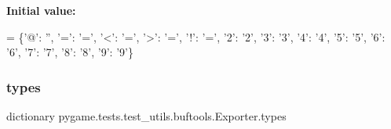 {\bfseries Initial value\+:}
\begin{DoxyCode}
=  \{\textcolor{stringliteral}{'@'}: \textcolor{stringliteral}{''}, \textcolor{stringliteral}{'='}: \textcolor{stringliteral}{'='}, \textcolor{stringliteral}{'<'}: \textcolor{stringliteral}{'='}, \textcolor{stringliteral}{'>'}: \textcolor{stringliteral}{'='}, \textcolor{stringliteral}{'!'}: \textcolor{stringliteral}{'='},
                \textcolor{stringliteral}{'2'}: \textcolor{stringliteral}{'2'}, \textcolor{stringliteral}{'3'}: \textcolor{stringliteral}{'3'}, \textcolor{stringliteral}{'4'}: \textcolor{stringliteral}{'4'}, \textcolor{stringliteral}{'5'}: \textcolor{stringliteral}{'5'},
                \textcolor{stringliteral}{'6'}: \textcolor{stringliteral}{'6'}, \textcolor{stringliteral}{'7'}: \textcolor{stringliteral}{'7'}, \textcolor{stringliteral}{'8'}: \textcolor{stringliteral}{'8'}, \textcolor{stringliteral}{'9'}: \textcolor{stringliteral}{'9'}\}
\end{DoxyCode}
\mbox{\label{classpygame_1_1tests_1_1test__utils_1_1buftools_1_1_exporter_aed962f94bf332ff5aa9f733ad3bb1a1c}} 
\subsubsection{\texorpdfstring{types}{types}}
{\footnotesize\ttfamily dictionary pygame.\+tests.\+test\+\_\+utils.\+buftools.\+Exporter.\+types\hspace{0.3cm}{\ttfamily [static]}}


